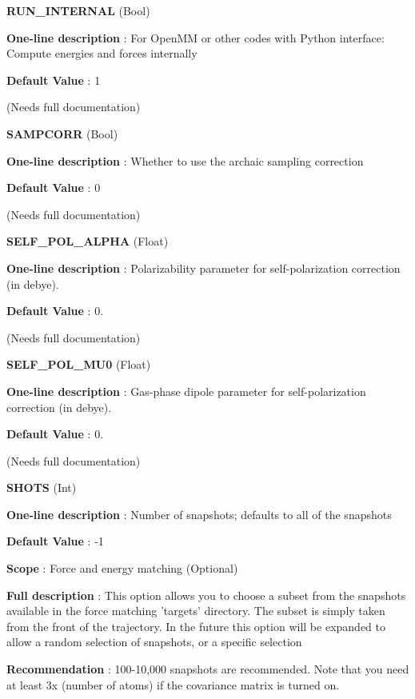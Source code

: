 \begin{DoxyItemize}
\item {\bfseries  R\-U\-N\-\_\-\-I\-N\-T\-E\-R\-N\-A\-L } (Bool) \par
{\bfseries  One-\/line description }\-: For Open\-M\-M or other codes with Python interface\-: Compute energies and forces internally \par
{\bfseries  Default Value }\-: 1 \par
(Needs full documentation)\end{DoxyItemize}
\begin{DoxyItemize}
\item {\bfseries  S\-A\-M\-P\-C\-O\-R\-R } (Bool) \par
{\bfseries  One-\/line description }\-: Whether to use the archaic sampling correction \par
{\bfseries  Default Value }\-: 0 \par
(Needs full documentation)\end{DoxyItemize}
\begin{DoxyItemize}
\item {\bfseries  S\-E\-L\-F\-\_\-\-P\-O\-L\-\_\-\-A\-L\-P\-H\-A } (Float) \par
{\bfseries  One-\/line description }\-: Polarizability parameter for self-\/polarization correction (in debye). \par
{\bfseries  Default Value }\-: 0. \par
(Needs full documentation)\end{DoxyItemize}
\begin{DoxyItemize}
\item {\bfseries  S\-E\-L\-F\-\_\-\-P\-O\-L\-\_\-\-M\-U0 } (Float) \par
{\bfseries  One-\/line description }\-: Gas-\/phase dipole parameter for self-\/polarization correction (in debye). \par
{\bfseries  Default Value }\-: 0. \par
(Needs full documentation)\end{DoxyItemize}
\begin{DoxyItemize}
\item {\bfseries  S\-H\-O\-T\-S } (Int) \par
{\bfseries  One-\/line description }\-: Number of snapshots; defaults to all of the snapshots \par
{\bfseries  Default Value }\-: -\/1 \par
{\bfseries  Scope }\-: Force and energy matching (Optional) \par
{\bfseries  Full description }\-: This option allows you to choose a subset from the snapshots available in the force matching 'targets' directory. The subset is simply taken from the front of the trajectory. In the future this option will be expanded to allow a random selection of snapshots, or a specific selection \par
{\bfseries  Recommendation }\-: 100-\/10,000 snapshots are recommended. Note that you need at least 3x (number of atoms) if the covariance matrix is turned on.\end{DoxyItemize}
